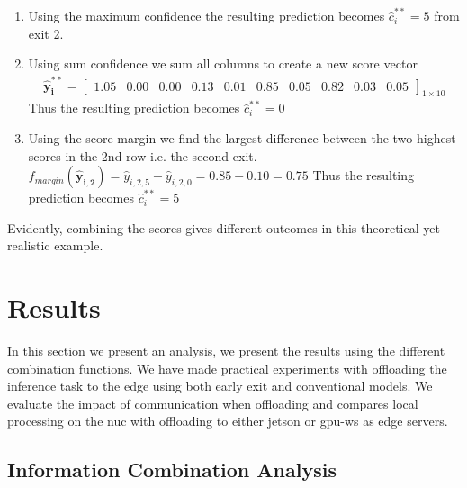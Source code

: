 {\begin{enumerate}
		\item 	Using the maximum confidence the resulting prediction becomes $ \hat{c}^{**}_{i} =  5$ from exit 2.
		\item 	Using sum confidence we sum all columns to create a new score vector
		\begin{align*}
		\bm{\hat{y}^{**}_{i}} = 
		\begin{bmatrix}
		1.05 & 0.00 & 0.00 & 0.13 & 0.01 & 0.85 & 0.05 & 0.82 & 0.03 & 0.05
		\end{bmatrix}_{1 \times 10}
		\end{align*}
		Thus the resulting prediction becomes $ \hat{c}^{**}_{i} = 0$
		\item Using the score-margin we find the largest difference between the two highest scores in the 2nd row i.e. the second exit. $ f_{margin}\left(\bm{\hat{y}_{i,2}}\right) = \hat{y}_{i,2,5} - \hat{y}_{i,2,0} = 0.85 - 0.10 =0.75 $ Thus the resulting prediction becomes $ \hat{c}^{**}_i = 5$
	\end{enumerate}
	Evidently, combining the scores gives different outcomes in this theoretical yet realistic example.
	
}

\section{Results} \label{sec:edge-results}

In this section we present an analysis, we present the results using the different combination functions. We have made practical experiments with offloading the inference task to the edge using both early exit and conventional models. We evaluate the impact of communication when offloading and compares local processing on the \gls{nuc} with offloading to either \gls{jetson} or \gls{gpu-ws} as edge servers.

\subsection{Information Combination Analysis}

